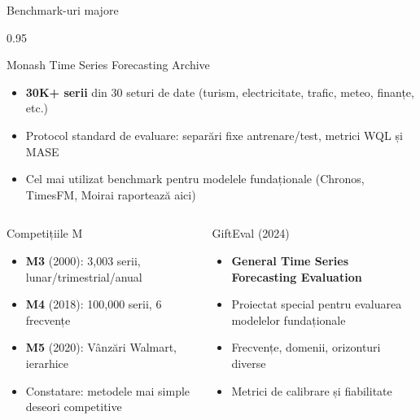 \documentclass[9pt, aspectratio=169, t]{beamer}
\begin{document}
\begin{frame}{Benchmark-uri majore}
    \begin{cminipage}{0.95\textwidth}
    \vspace{-2mm}
    {\scriptsize
    \begin{block}{Monash Time Series Forecasting Archive}
        \begin{itemize}\setlength{\itemsep}{0pt}
            \item \textbf{30K+ serii} din 30 seturi de date (turism, electricitate, trafic, meteo, finanțe, etc.)
            \item Protocol standard de evaluare: separări fixe antrenare/test, metrici WQL și MASE
            \item Cel mai utilizat benchmark pentru modelele fundaționale (Chronos, TimesFM, Moirai raportează aici)
        \end{itemize}
    \end{block}
    \vspace{-2mm}
    \begin{columns}[T]
        \begin{exampleblock}{Competițiile M}
            \begin{itemize}\setlength{\itemsep}{0pt}
                \item \textbf{M3} (2000): 3{,}003 serii, lunar/trimestrial/anual
                \item \textbf{M4} (2018): 100{,}000 serii, 6 frecvențe
                \item \textbf{M5} (2020): Vânzări Walmart, ierarhice
                \item Constatare: metodele mai simple deseori competitive
            \end{itemize}
        \end{exampleblock}

        \begin{alertblock}{GiftEval (2024)}
            \begin{itemize}\setlength{\itemsep}{0pt}
                \item \textbf{General Time Series Forecasting Evaluation}
                \item Proiectat special pentru evaluarea modelelor fundaționale
                \item Frecvențe, domenii, orizonturi diverse
                \item Metrici de calibrare și fiabilitate
            \end{itemize}
        \end{alertblock}
    \end{columns}
    }
    \end{cminipage}
\end{frame}
\end{document}

